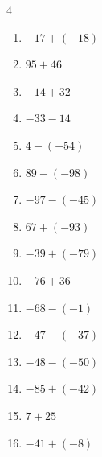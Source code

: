 \begin{multicols}{4}
\begin{enumerate}
  \item $-17+(-18)$

        \phantom{$=-35$}

  \item $95+46$

        \phantom{$=141$}

  \item $-14+32$

        \phantom{$=18$}

  \item $-33-14$

        \phantom{$=-47$}

  \item $4-(-54)$

        \phantom{$=58$}

  \item $89-(-98)$

        \phantom{$=187$}

  \item $-97-(-45)$

        \phantom{$=-52$}

  \item $67+(-93)$

        \phantom{$=-26$}

  \item $-39+(-79)$

        \phantom{$=-118$}

  \item $-76+36$

        \phantom{$=-40$}

  \item $-68-(-1)$

        \phantom{$=-67$}

  \item $-47-(-37)$

        \phantom{$=-10$}

  \item $-48-(-50)$

        \phantom{$=2$}

  \item $-85+(-42)$

        \phantom{$=-127$}

  \item $7+25$

        \phantom{$=32$}

  \item $-41+(-8)$

        \phantom{$=-49$}


\end{enumerate}
\end{multicols}
